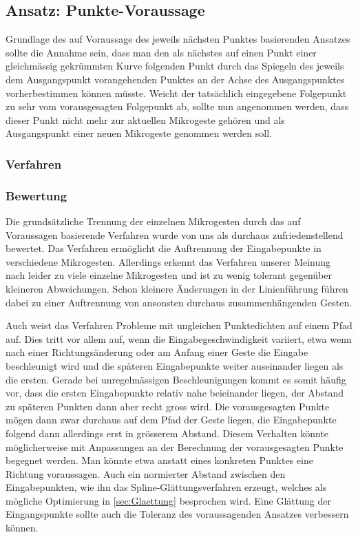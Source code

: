 \subsection{Ansatz: Punkte-Voraussage}
Grundlage des auf Voraussage des jeweils nächsten Punktes basierenden Ansatzes sollte die Annahme sein, dass man den als nächstes auf einen Punkt einer gleichmässig gekrümmten Kurve folgenden Punkt durch das Spiegeln des jeweils dem Ausgangspunkt vorangehenden Punktes an der Achse des Ausgangspunktes vorherbestimmen können müsste. Weicht der tatsächlich eingegebene Folgepunkt zu sehr vom vorausgesagten Folgepunkt ab, sollte nun angenommen werden, dass dieser Punkt nicht mehr zur aktuellen Mikrogeste gehören und als Ausgangspunkt einer neuen Mikrogeste genommen werden soll.

\subsubsection{Verfahren}


\subsubsection{Bewertung}
Die grundsätzliche Trennung der einzelnen Mikrogesten durch das auf Voraussagen basierende Verfahren wurde von uns als durchaus zufriedenstellend bewertet. Das Verfahren ermöglicht die Auftrennung der Eingabepunkte in verschiedene Mikrogesten. Allerdings erkennt das Verfahren unserer Meinung nach leider zu viele einzelne Mikrogesten und ist zu wenig tolerant gegenüber kleineren Abweichungen. Schon kleinere Änderungen in der Linienführung führen dabei zu einer Auftrennung von ansonsten durchaus zusammenhängenden Gesten.

Auch weist das Verfahren Probleme mit ungleichen Punktedichten auf einem Pfad auf. Dies tritt vor allem auf, wenn die Eingabegeschwindigkeit variiert, etwa wenn nach einer Richtungsänderung oder am Anfang einer Geste die Eingabe beschleunigt wird und die späteren Eingabepunkte weiter auseinander liegen als die ersten. Gerade bei unregelmässigen Beschleunigungen kommt es somit häufig vor, dass die ersten Eingabepunkte relativ nahe beieinander liegen, der Abstand zu späteren Punkten dann aber recht gross wird. Die vorausgesagten Punkte mögen dann zwar durchaus auf dem Pfad der Geste liegen, die Eingabepunkte folgend dann allerdings erst in grösserem Abstand. Diesem Verhalten könnte möglicherweise mit Anpassungen an der Berechnung der vorausgesagten Punkte begegnet werden. Man könnte etwa anstatt eines konkreten Punktes eine Richtung voraussagen. Auch ein normierter Abstand zwischen den Eingabepunkten, wie ihn das Spline-Glättungsverfahren erzeugt, welches als mögliche Optimierung in \ref{sec:Glaettung} besprochen wird. Eine Glättung der Eingangspunkte sollte auch die Toleranz des voraussagenden Ansatzes verbessern können.


